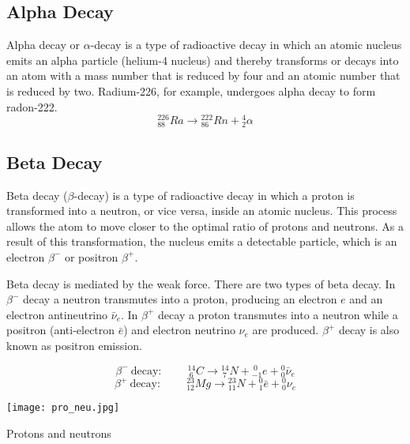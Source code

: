 \subsection{Alpha Decay}
Alpha decay or $\alpha$-decay is a type of radioactive decay in which an atomic nucleus emits an alpha particle (helium-4 nucleus) and thereby transforms or decays into an atom with a mass number that is reduced by four and an atomic number that is reduced by two.  
Radium-226, for example, undergoes alpha decay to form radon-222.
$${}_{88}^{226}Ra \longrightarrow {}_{86}^{222}Rn +{}_{2}^{4}\alpha$$
\subsection{Beta Decay}
Beta decay ($\beta$-decay) is a type of radioactive decay in which a proton is transformed into a neutron, or vice versa, inside an atomic nucleus. This process allows the atom to move closer to the optimal ratio of protons and neutrons. As a result of this transformation, the nucleus emits a detectable particle, which is an electron $\beta^-$ or positron $\beta^+$.

Beta decay is mediated by the weak force. There are two types of beta decay.  In $\beta^-$ decay a neutron transmutes into a proton, producing an electron $e$ and an electron antineutrino $\bar{\nu}_e$.  In $\beta^+$ decay a proton transmutes into a neutron while a positron (anti-electron $\bar{e}$) and electron neutrino $\nu_e$ are produced.  $\beta^+$ decay is also known as positron emission.

$$\beta^-\  \text{decay:} \hspace{1cm} {}_{\ 6}^{14}C \longrightarrow {}_{\ 7}^{14}N +{}_{-1}^{\ 0}e + {}_{0}^{0}\bar{\nu}_e$$
$$\beta^+\  \text{decay:} \hspace{1cm}{}_{12}^{23}Mg \longrightarrow {}_{11}^{23}N +{}_{1}^{0}\bar{e} + {}_{0}^{0}\nu_e$$
\begin{marginfigure}[-50pt]
  \texttt{[image: pro\_neu.jpg]}
  \caption{Protons and neutrons}
  \label{fig:fig}
\end{marginfigure}

\newpage

